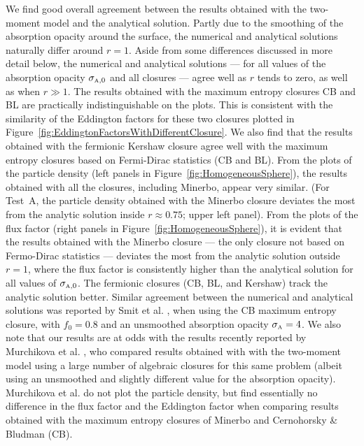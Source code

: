 We find good overall agreement between the results obtained with the two-moment model and the analytical solution.  
Partly due to the smoothing of the absorption opacity around the surface, the numerical and analytical solutions naturally differ around $r=1$.  
Aside from some differences discussed in more detail below, the numerical and analytical solutions --- for all values of the absorption opacity $\sigma_{\mbox{\tiny A},0}$ and all closures --- agree well as $r$ tends to zero, as well as when $r\gg1$.  
The results obtained with the maximum entropy closures CB and BL are practically indistinguishable on the plots.  
This is consistent with the similarity of the Eddington factors for these two closures plotted in Figure~\ref{fig:EddingtonFactorsWithDifferentClosure}.  
We also find that the results obtained with the fermionic Kershaw closure agree well with the maximum entropy closures based on Fermi-Dirac statistics (CB and BL).  
From the plots of the particle density (left panels in Figure~\ref{fig:HomogeneousSphere}), the results obtained with all the closures, including Minerbo, appear very similar.  
(For Test~A, the particle density obtained with the Minerbo closure deviates the most from the analytic solution inside $r\approx0.75$; upper left panel).  
From the plots of the flux factor (right panels in Figure~\ref{fig:HomogeneousSphere}), it is evident that the results obtained with the Minerbo closure --- the only closure not based on Fermo-Dirac statistics --- deviates the most from the analytic solution outside $r=1$, where the flux factor is consistently higher than the analytical solution for all values of $\sigma_{\mbox{\tiny A},0}$.  
The fermionic closures (CB, BL, and Kershaw) track the analytic solution better.  
Similar agreement between the numerical and analytical solutions was reported by Smit et al. \cite{smit_etal_1997}, when using the CB maximum entropy closure, with $f_{0}=0.8$ and an unsmoothed absorption opacity $\sigma_{\mbox{\tiny A}}=4$.  
We also note that our results are at odds with the results recently reported by Murchikova et al. \cite{murchikova_etal_2017}, who compared results obtained with with the two-moment model using a large number of algebraic closures for this same problem (albeit using an unsmoothed and slightly different value for the absorption opacity).  
Murchikova et al. do not plot the particle density, but find essentially no difference in the flux factor and the Eddington factor when comparing results obtained with the maximum entropy closures of Minerbo and Cernohorsky \& Bludman (CB).  

